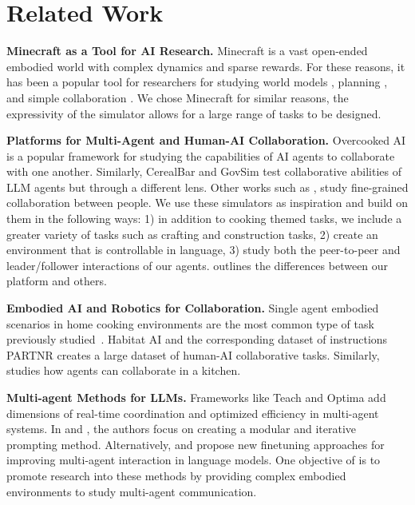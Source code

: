 \section{Related Work}



\textbf{Minecraft as a Tool for AI Research.} 
Minecraft is a vast open-ended embodied world with complex dynamics and sparse rewards.
For these reasons, it has been a popular tool for researchers for studying world models \citep{hafner2025mastering}, planning \citep{wangvoyager, nottingham2023embodied}, and simple collaboration \citep{bara-etal-2021-mindcraft, yu2024mineland}.
We chose Minecraft for similar reasons, the expressivity of the simulator allows for a large range of tasks to be designed.




\textbf{Platforms for Multi-Agent and Human-AI Collaboration.} 
Overcooked AI \citep{carroll2019utility} is a popular framework for studying the capabilities of AI agents to collaborate with one another. 
Similarly, CerealBar \citep{suhr-etal-2019-executing} and GovSim \citep{piatti2024cooperate} test collaborative abilities of LLM agents but through a different lens. 
Other works such as \citep{bohus2024towards, wan2024infer, haduong2024cps}, study fine-grained collaboration between people. 
We use these simulators as inspiration and build on them in the following ways: 1) in addition to cooking themed tasks, we include a greater variety of tasks such as crafting and construction tasks, 2) create an environment that is controllable in language, 3) study both the peer-to-peer and leader/follower interactions of our agents.
 outlines the differences between our platform and others. %


\textbf{Embodied AI and Robotics for Collaboration.} 
Single agent embodied scenarios in home cooking environments are the most common type of task previously studied~\citep{li2024embodied, procthor, savva2019habitat}. 
Habitat AI and the corresponding dataset of instructions PARTNR \cite{chang2024partnr} creates a large dataset of human-AI collaborative tasks. 
Similarly, \cite{zhangbuilding} studies how agents can collaborate in a kitchen. 

\textbf{Multi-agent Methods for LLMs.} 
Frameworks like Teach \citep{padmakumar2022teach} and Optima \citep{chen2024optima} add dimensions of real-time coordination and optimized efficiency in multi-agent systems. 
In \cite{zhangbuilding} and \cite{yu2024mineland}, the authors focus on creating a modular and iterative prompting method. 
Alternatively, \cite{motwani2024malt} and \cite{chen2024magdi} propose new finetuning approaches for improving multi-agent interaction in language models.
One objective of \mindcraft{} is to promote research into these methods by providing complex embodied environments to study multi-agent communication. 

